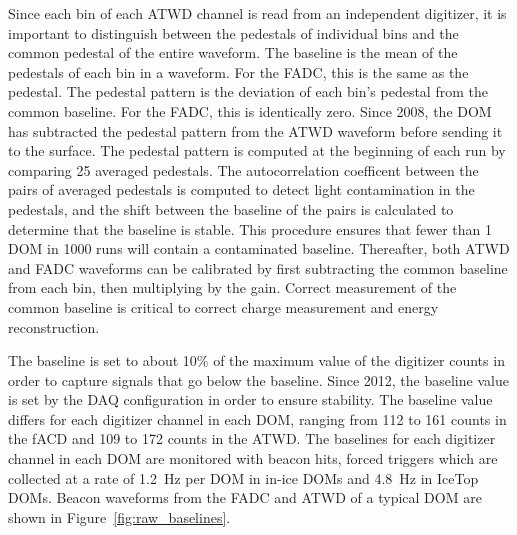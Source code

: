 Since each bin of each ATWD channel is read from an independent
digitizer, it is important to distinguish between the pedestals of
individual bins and the common pedestal of the entire waveform. The
baseline is the mean of the pedestals of each bin in a waveform. For
the FADC, this is the same as the pedestal. The pedestal pattern is
the deviation of each bin's pedestal from the common baseline. For the
FADC, this is identically zero. Since 2008, the DOM has subtracted the
pedestal pattern from
the ATWD waveform before sending it to the surface. The pedestal pattern is computed at the beginning of each
run by comparing 25 averaged pedestals. The autocorrelation coefficent
between the pairs of averaged pedestals is computed to detect light
contamination in the pedestals, and the shift between the baseline of
the pairs is calculated to determine that the baseline is stable. This
procedure ensures that fewer than 1 DOM in 1000 runs will contain a
contaminated baseline. Thereafter, both ATWD
and FADC waveforms can be calibrated by first subtracting the common
baseline from each bin, then multiplying by the gain. Correct
measurement of the common baseline is critical to correct charge
measurement and energy reconstruction.

The baseline is set to about 10\% of the maximum value of the
digitizer counts in
order to capture signals that go below the baseline. Since 2012, the baseline value is set by the DAQ configuration in order to ensure
stability. The baseline value differs for each digitizer channel in
each DOM, ranging from 112 to 161 counts in the fACD and 109 to 172
counts in the ATWD. The baselines for each digitizer channel in each DOM are monitored with
beacon hits, forced triggers which are collected at a rate of 1.2~Hz
per DOM
in in-ice DOMs and 4.8~Hz in IceTop DOMs. Beacon waveforms
from the FADC and ATWD of a typical DOM are shown in Figure~\ref{fig:raw_baselines}.

